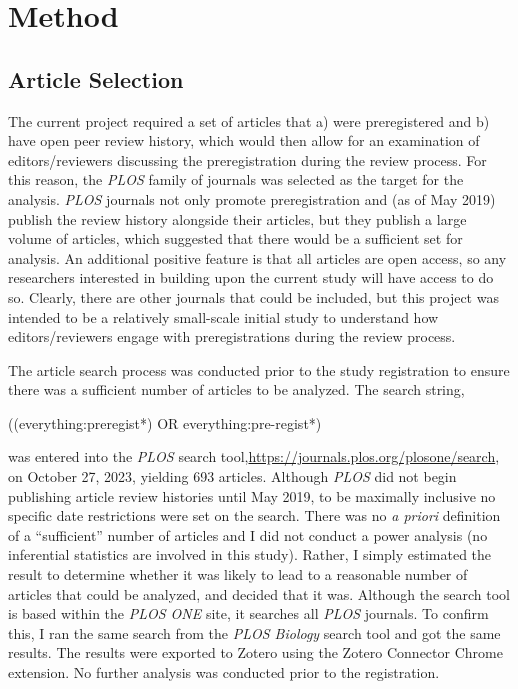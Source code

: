 \documentclass[authordate, meta, issue]{jote-new-article}
\begin{document}
	\section{\textbf{Method}}



	\subsection{Article Selection}



	The current project required a set of articles that a) were preregistered and b) have open peer review history, which would then allow for an examination of editors/reviewers discussing the preregistration during the review process. For this reason, the \emph{PLOS} family of journals was selected as the target for the analysis. \emph{PLOS} journals not only promote preregistration and (as of May 2019) publish the review history alongside their articles, but they publish a large volume of articles, which suggested that there would be a sufficient set for analysis. An additional positive feature is that all articles are open access, so any researchers interested in building upon the current study will have access to do so. Clearly, there are other journals that could be included, but this project was intended to be a relatively small-scale initial study to understand how editors/reviewers engage with preregistrations during the review process.



	The article search process was conducted prior to the study registration to ensure there was a sufficient number of articles to be analyzed. The search string,



	((everything:preregist*) OR everything:pre-regist*)



	was entered into the \emph{PLOS} search tool,\url{https://journals.plos.org/plosone/search}, on October 27, 2023, yielding 693 articles. Although \emph{PLOS} did not begin publishing article review histories until May 2019, to be maximally inclusive no specific date restrictions were set on the search. There was no \emph{a priori} definition of a “sufficient” number of articles and I did not conduct a power analysis (no inferential statistics are involved in this study). Rather, I simply estimated the result to determine whether it was likely to lead to a reasonable number of articles that could be analyzed, and decided that it was. Although the search tool is based within the \emph{PLOS ONE} site, it searches all \emph{PLOS} journals. To confirm this, I ran the same search from the \emph{PLOS Biology} search tool and got the same results. The results were exported to Zotero using the Zotero Connector Chrome extension. No further analysis was conducted prior to the registration.
\end{document}
